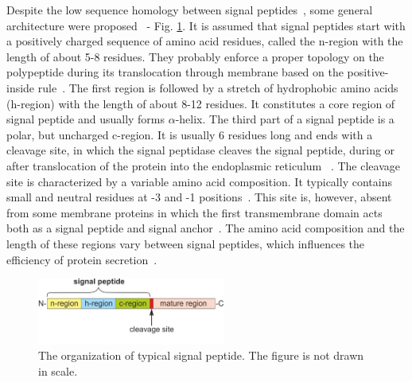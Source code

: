 \documentclass[fleqn,10pt,twoside]{gcb15submission}
\begin{document}
Despite the low sequence homology between signal peptides~\citep{1999ladungaphysean}, some general architecture were proposed~\citep{1994izardsignal, 2013vossmechanism} - Fig. \ref{fig:sparch}. It is assumed that signal peptides start with a positively charged sequence of amino acid residues, called the n-region with the length of about 5-8 residues. They probably enforce a proper topology on the polypeptide during its translocation through membrane based on the positive-inside rule~\citep{1988vonheijnetopogenic}. The first region is followed by a stretch of hydrophobic amino acids (h-region) with the length of about 8-12 residues. It constitutes a core region of signal peptide and usually forms $\alpha$-helix. The third part of a signal peptide is a polar, but uncharged c-region. It is usually 6 residues long and ends with a cleavage site, in which the signal peptidase cleaves the signal peptide, during or after translocation of the protein into the endoplasmic reticulum ~\citep{2002paetzelsignal}. The cleavage site is characterized by a variable amino acid composition. It typically contains small and neutral residues at -3 and -1 positions~\citep{1994palzkillselection}. This site is, however, absent from some membrane proteins in which the first transmembrane domain acts both as a signal peptide and signal anchor~\citep{1988szczesnaskorupapositive}. The amino acid composition and the length of these regions vary between signal peptides, which influences the efficiency of protein secretion~\citep{2006hegdethe}.

\begin{figure}[ht]\centering
\includegraphics[width=0.55\textwidth]{figures/SP.png}
\caption{The organization of typical signal peptide. The figure is not drawn in scale.}
\label{fig:sparch}
\end{figure}
\end{document}
